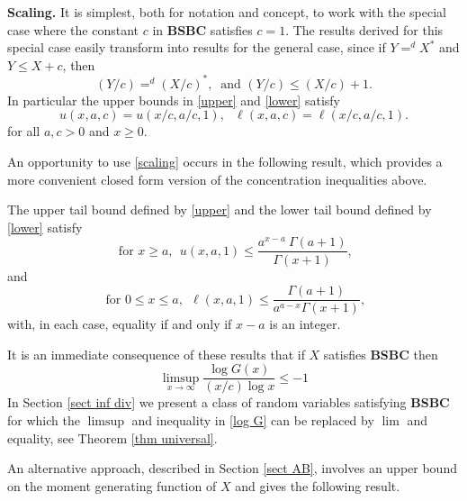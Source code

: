 \documentclass[smallextended,envcountsect]{svjour3}
\begin{document}
\begin{remark} \label{remark scaling} {\bf Scaling.} It is simplest, both for notation and concept, to work with the special case where the constant $c$ in {\bf BSBC} satisfies $c=1$.  The results derived for this special case easily transform into results for the general case, since if $Y =^d X^*$ and $Y \le X+c$, then
\begin{equation}\label{make c one with everything}
(Y/c) =^d (X/c)^*, \ \text{ and }(Y/c) \le (X/c) + 1.
\end{equation}
In particular the upper bounds in \eqref{upper} and \eqref{lower} satisfy
\begin{equation}\label{scaling}
     u(x,a,c) = u(x/c,a/c,1), \ \ \ \ell(x,a,c) = \ell(x/c,a/c,1).
\end{equation}
for all $a,c>0$ and $x \ge 0$.
\end{remark}

An opportunity to use \eqref{scaling} occurs in the following result, which provides a more convenient closed form version of the concentration inequalities above.

\begin{theorem}\label{theorem gamma}  The upper tail bound defined by \eqref{upper} and the lower tail bound defined by \eqref{lower}
satisfy
 \begin{equation}\label{gamma upper 1}
   \text{ for } x\ge a, \ \     u(x,a,1) \le \frac{ a^{x-a} \ \Gamma(a+1)}{\Gamma(x+1)},
\end{equation}
and
\begin{equation}\label{gamma lower 1}
  \text{ for } 0 \le x \le a, \ \    \ell(x,a,1) \le  \frac{\Gamma(a+1)}{a^{a-x}\Gamma(x+1)},
\end{equation}
with, in each case, equality if and only if $x-a$ is an integer.
\end{theorem}

It is an immediate consequence of these results that if $X$ satisfies {\bf  BSBC} then
     \begin{equation} \label{log G}
     \limsup_{x \to \infty} \frac{\log G(x)}{(x/c) \log x} \le -1
     \end{equation}
In Section \ref{sect inf div} we present a class of random variables satisfying {\bf BSBC} for which the $\limsup$ and inequality in \eqref{log G} can be replaced by $\lim$ and equality, see Theorem \ref{thm universal}.

An alternative approach, described in Section \ref{sect AB}, involves an upper bound on the moment generating function of $X$ and gives the following result.
\end{document}
